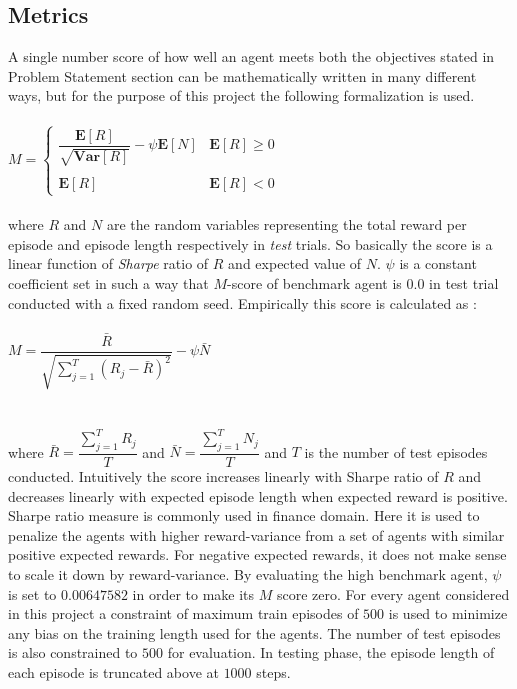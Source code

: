 \documentclass{article}
\begin{document}
\subsection*{Metrics}
A single number score of how well an agent meets both the objectives stated in Problem Statement section can be mathematically written in many different ways, but for the purpose of this project the following formalization is used.\\\\
$M = \begin{cases} \dfrac{\mathbf{E}[R]}{\sqrt{\mathbf{Var}[R]}} - \psi \mathbf{E}[N] & \mathbf{E}[R] \ge 0\\\\
 \mathbf{E}[R] & \mathbf{E}[R] < 0 \end{cases}$\\\\
where $R$ and $N$ are the random variables representing the total reward per episode and episode length respectively in \textit{test} trials. So basically the score is a linear function of \textit{Sharpe} ratio of $R$ and expected value of $N$. $\psi$ is a constant coefficient set in such a way that $M$-score of benchmark agent is 0.0 in test trial conducted with a fixed random seed. Empirically this score is calculated as :\\\\
$M = \dfrac{\bar{R}}{\sqrt{\sum_{j=1}^{T} \left( R_j - \bar{R}\right)^2}} - \psi \bar{N}$\\\\\\
where $\bar{R} = \dfrac{\sum_{j=1}^{T} R_j}{T}$ and $\bar{N} = \dfrac{\sum_{j=1}^{T} N_j}{T}$ and $T$ is the number of test episodes conducted. Intuitively the score increases linearly with Sharpe ratio of $R$ and decreases linearly with expected episode length when expected reward is positive. Sharpe ratio measure is commonly used in finance domain. Here it is used to penalize the agents with higher reward-variance from a set of agents with similar positive expected rewards. For negative expected rewards, it does not make sense to scale it down by reward-variance.
By evaluating the high benchmark agent, $\psi$ is set to $0.00647582$ in order to make its $M$ score zero. For every agent considered in this project a constraint of maximum train episodes of $500$ is used to minimize any bias on the training length used for the agents. The number of test episodes is also constrained to $500$ for evaluation. In testing phase, the episode length of each episode is truncated above at $1000$ steps.
\end{document}
